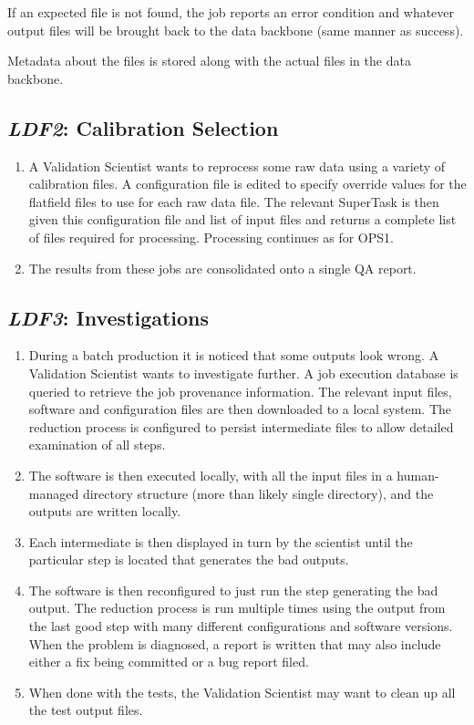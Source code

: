 \documentclass[DM,toc,lsstdraft]{lsstdoc}
\newcommand{\usecase}[3]{%
\subsection{\emph{#1}: #2}
\label{use:#1}
\begin{enumerate}[label=\alph*.]
#3
\end{enumerate}
}
\begin{document}
{\item
If an expected file is not found, the job reports an error condition and whatever output files will be brought back to the data backbone (same manner as success).

\item
Metadata about the files is stored along with the actual files in the data backbone.

}

\usecase{LDF2}{Calibration Selection}{%

\item
A Validation Scientist wants to reprocess some raw data using a variety of calibration files.
A configuration file is edited to specify override values for the flatfield files to use for each raw data file.
The relevant SuperTask is then given this configuration file and list of input files and returns a complete list of files required for processing.
Processing continues as for OPS1.

\item
The results from these jobs are consolidated onto a single QA report.

}

\usecase{LDF3}{Investigations}{%

\item
During a batch production it is noticed that some outputs look wrong.
A Validation Scientist wants to investigate further.
A job execution database is queried to retrieve the job provenance information.
The relevant input files, software and configuration files are then downloaded to a local system.
The reduction process is configured to persist intermediate files to allow detailed examination of all steps.

\item
The software is then executed locally, with all the input files in a human-managed directory structure (more than likely single directory), and the outputs are written locally.

\item
Each intermediate is then displayed in turn by the scientist until the particular step is located that generates the bad outputs.

\item
The software is then reconfigured to just run the step generating the bad output.
The reduction process is run multiple times using the output from the last good step with many different configurations and software versions.
When the problem is diagnosed, a report is written that may also include either a fix being committed or a bug report filed.

\item
When done with the tests, the Validation Scientist may want to clean up all the test output files.

}
\end{document}
